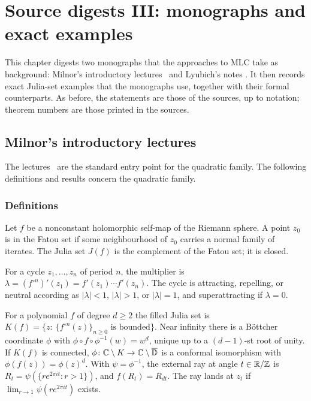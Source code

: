 \chapter{Source digests III: monographs and exact examples}
\label{ch:digests-monographs}

This chapter digests two monographs that the approaches to MLC take as
background: Milnor's introductory lectures~\cite{Milnor} and Lyubich's notes
\cite{LyubichNotes}.  It then records exact Julia-set examples that the
monographs use, together with their formal counterparts.  As before, the
statements are those of the sources, up to notation; theorem numbers are
those printed in the sources.

\section{Milnor's introductory lectures}
\label{sec:digest-milnor}

The lectures~\cite{Milnor} are the standard entry point for the quadratic
family.  The following definitions and results concern the quadratic family.

\subsection*{Definitions}

\begin{definition}
\label{def:milnor-fatou-julia}
Let $f$ be a nonconstant holomorphic self-map of the Riemann sphere.  A point
$z_0$ is in the Fatou set if some neighbourhood of $z_0$ carries a normal family of
iterates.  The Julia set $J(f)$ is the complement of the Fatou set; it is closed.
\end{definition}

\begin{definition}
\label{def:milnor-multiplier}
For a cycle $z_1,\dots,z_n$ of period $n$, the multiplier is
$\lambda=(f^{\circ n})'(z_1)=f'(z_1)\cdots f'(z_n)$.  The cycle is attracting,
repelling, or neutral according as $|\lambda|<1$, $|\lambda|>1$, or $|\lambda|=1$,
and superattracting if $\lambda=0$.
\end{definition}

\begin{definition}
\label{def:milnor-K-bottcher-rays}
For a polynomial $f$ of degree $d\ge2$ the filled Julia set is
$K(f)=\{z:\ \{f^{\circ n}(z)\}_{n\ge0}\text{ is bounded}\}$.  Near infinity there is a
Böttcher coordinate $\phi$ with $\phi\circ f\circ\phi^{-1}(w)=w^d$, unique up to a
$(d-1)$-st root of unity.  If $K(f)$ is connected, $\phi\colon\mathbb C\setminus K\to\mathbb C\setminus\overline{\mathbb D}$
is a conformal isomorphism with $\phi(f(z))=\phi(z)^d$.  With $\psi=\phi^{-1}$, the
external ray at angle $t\in\mathbb R/\mathbb Z$ is $R_t=\psi(\{re^{2\pi it}:r>1\})$, and $f(R_t)=R_{dt}$.
The ray lands at $z_t$ if $\lim_{r\to1}\psi(re^{2\pi it})$ exists.
\end{definition}

